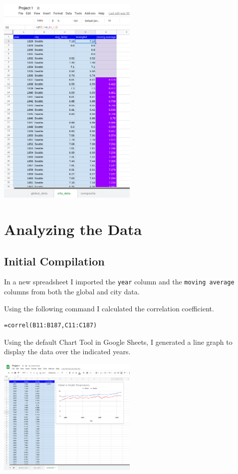 \documentclass[12pt]{article}
\begin{document}
\begin{center}
\includegraphics[width=0.5\textwidth]{city_data.png}
\end{center}

\pagebreak

\section{Analyzing the Data}

\subsection{Initial Compilation}

In a new spreadsheet I imported the \lstinline{year} column and the \lstinline{moving average} columns from both the global and city data.

Using the following command I calculated the correlation coefficient.

\begin{verbatim}
=correl(B11:B187,C11:C187)
\end{verbatim}

Using the default Chart Tool in Google Sheets, I generated a line graph to display the data over the indicated years.

\begin{center}
\includegraphics[width=0.5\textwidth]{composite.png}
\end{center}
\end{document}

